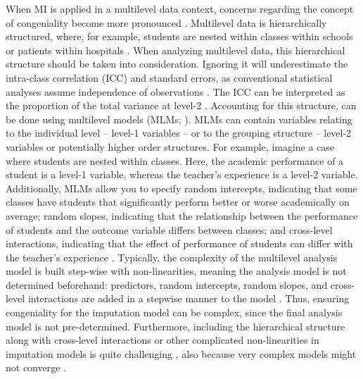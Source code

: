 \documentclass[10pt, a4paper, titlepage]{article}
\begin{document}
When MI is applied in a multilevel data context, concerns regarding the concept of congeniality become more pronounced \citep{mistlerComparisonJointModel2017, enders2018, enders2018a, enders2020, buurenFlexibleImputationMissing2018, taljaard2008, enders2016, resche-rigon2018, audigier2018, dong2023, grund2016, grund2018a, grund2018, ludtke2017, grund2021, quartagno2022}. Multilevel data is hierarchically structured, where, for example, students are nested within classes within schools or patients within hospitals \citep{hox2017, hox2011}. When analyzing multilevel data, this hierarchical structure should be taken into consideration. Ignoring it will underestimate the intra-class correlation (ICC) and standard errors, as conventional statistical analyses assume independence of observations \citep{buurenFlexibleImputationMissing2018, ludtke2017, taljaard2008, hox2011}. The ICC can be interpreted as the proportion of the total variance at level-2 \citep{gulliford2005, shieh2012, hox2011}. Accounting for this structure, can be done using multilevel models (MLMs; ). MLMs can contain variables relating to the individual level -- level-1 variables -- or to the grouping structure -- level-2 variables or potentially higher order structures. For example, imagine a case where students are nested within classes. Here, the academic performance of a student is a level-1 variable, whereas the teacher's experience is a level-2 variable. Additionally, MLMs allow you to specify random intercepts, indicating that some classes have students that significantly perform better or worse academically on average; random slopes, indicating that the relationship between the performance of students and the outcome variable differs between classes; and cross-level interactions, indicating that the effect of performance of students can differ with the teacher's experience \citep{hox2017, hox2011}. Typically, the complexity of the multilevel analysis model is built step-wise with non-linearities, meaning the analysis model is not determined beforehand: predictors, random intercepts, random slopes, and cross-level interactions are added in a stepwise manner to the model \citep{hox2017, hox2011}. Thus, ensuring congeniality for the imputation model can be complex, since the final analysis model is not pre-determined. Furthermore, including the hierarchical structure along with cross-level interactions or other complicated non-linearities in imputation models is quite challenging \citep{buurenFlexibleImputationMissing2018, burgette2010, hox2011}, also because very complex models might not converge \citep{buurenFlexibleImputationMissing2018}.
\end{document}
